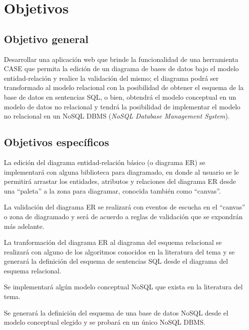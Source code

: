 \section{Objetivos}

\subsection*{Objetivo general}
Desarrollar una aplicación web que brinde la funcionalidad de una herramienta CASE que permita la edición de un diagrama de bases de datos bajo el modelo entidad-relación y realice la validación del mismo; el diagrama podrá ser transformado al modelo relacional con la posibilidad de obtener el esquema de la base de datos en sentencias SQL, o bien, obtendrá el modelo conceptual en un modelo de datos no relacional y tendrá la posibilidad de implementar el modelo no relacional en un NoSQL DBMS (\textit{NoSQL Database Management System}).

\subsection*{Objetivos específicos}

La edición del diagrama entidad-relación básico (o diagrama ER) se implementará con alguna biblioteca para diagramado, en donde al usuario se le permitirá arrastar los entidades, atributos y relaciones del diagrama ER desde una ``paleta''  a la zona para diagramar, conocida también como ``canvas''.


La validación del diagrama ER se realizará con eventos de escucha en el ``canvas'' o zona de diagramado y será de acuerdo a reglas de validación que se expondrán más adelante.


La tranformación del diagrama ER al diagrama del esquema relacional se realizará con alguno de los algoritmos conocidos en la literatura del tema y se generará la definición del esquema de sentencias SQL desde el diagrama del esquema relacional.


Se implementará algún modelo conceptual NoSQL que exista en la literatura del tema.


Se generará la definición del esquema de una base de datos NoSQL desde el modelo conceptual elegido y se probará en un único NoSQL DBMS.